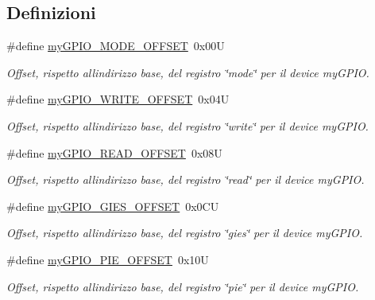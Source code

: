 \subsection*{Definizioni}
\begin{DoxyCompactItemize}
\item 
\#define \hyperlink{group__bare-metal_ga81a662103d6ed053978c0a9b4c273065}{my\+G\+P\+I\+O\+\_\+\+M\+O\+D\+E\+\_\+\+O\+F\+F\+S\+ET}~0x00U
\begin{DoxyCompactList}\small\item\em Offset, rispetto all\textquotesingle{}indirizzo base, del registro \char`\"{}mode\char`\"{} per il device my\+G\+P\+IO. \end{DoxyCompactList}\item 
\#define \hyperlink{group__bare-metal_ga2e45778b6ca9ce6f5768b3f7a4557ce1}{my\+G\+P\+I\+O\+\_\+\+W\+R\+I\+T\+E\+\_\+\+O\+F\+F\+S\+ET}~0x04U
\begin{DoxyCompactList}\small\item\em Offset, rispetto all\textquotesingle{}indirizzo base, del registro \char`\"{}write\char`\"{} per il device my\+G\+P\+IO. \end{DoxyCompactList}\item 
\#define \hyperlink{group__bare-metal_ga584d2dfece76e5762030d918d80592cc}{my\+G\+P\+I\+O\+\_\+\+R\+E\+A\+D\+\_\+\+O\+F\+F\+S\+ET}~0x08U
\begin{DoxyCompactList}\small\item\em Offset, rispetto all\textquotesingle{}indirizzo base, del registro \char`\"{}read\char`\"{} per il device my\+G\+P\+IO. \end{DoxyCompactList}\item 
\#define \hyperlink{group__bare-metal_gad251e4d87d464525d4a2858977468994}{my\+G\+P\+I\+O\+\_\+\+G\+I\+E\+S\+\_\+\+O\+F\+F\+S\+ET}~0x0\+CU
\begin{DoxyCompactList}\small\item\em Offset, rispetto all\textquotesingle{}indirizzo base, del registro \char`\"{}gies\char`\"{} per il device my\+G\+P\+IO. \end{DoxyCompactList}\item 
\#define \hyperlink{group__bare-metal_gaece3c1c9f504249d6b8ab060d8bb2738}{my\+G\+P\+I\+O\+\_\+\+P\+I\+E\+\_\+\+O\+F\+F\+S\+ET}~0x10U
\begin{DoxyCompactList}\small\item\em Offset, rispetto all\textquotesingle{}indirizzo base, del registro \char`\"{}pie\char`\"{} per il device my\+G\+P\+IO. \end{DoxyCompactList}\item 

\end{DoxyCompactItemize}
